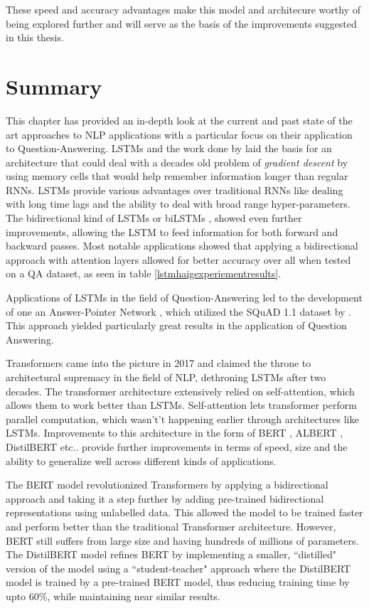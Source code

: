 \documentclass[a4paper,12pt]{report}
\begin{document}
	    These speed and accuracy advantages make this model and architecure worthy of being explored further and will serve as the basis of the improvements suggested in this thesis.

		\section{Summary}
		
		This chapter has provided an in-depth look at the current and past state of the art approaches to NLP applications with a particular focus on their application to Question-Answering. LSTMs and the work done by \citep{lstmoriginal} laid the basis for an architecture that could deal with a decades old problem of \textit{gradient descent} by using memory cells that would help remember information longer than regular RNNs. 
		LSTMs provide various advantages over traditional RNNs like dealing with long time lags and the ability to deal with broad range hyper-parameters. The bidirectional kind of LSTMs or biLSTMs \citep{bilstmHerman}, showed even further improvements, allowing the LSTM to feed information for both forward and backward passes. Most notable applications showed that applying a bidirectional approach with attention layers allowed for better accuracy over all when tested on a QA dataset, as seen in table \ref{lstmhaigexperiementresults}.
		
		Applications of LSTMs in the field of Question-Answering led to the development of one an Answer-Pointer Network \citep{lstmhu2016question}, which utilized the SQuAD 1.1 dataset by \citep{dataset1}. This approach yielded particularly great results in the application of Question Answering. 
		
		Transformers came into the picture in 2017 \citep{atayl} and claimed the throne to architectural supremacy in the field of NLP, dethroning LSTMs after two decades. The transformer architecture extensively relied on self-attention, which allows them to work better than LSTMs. Self-attention lets transformer perform parallel computation, which wasn't't happening earlier through architectures like LSTMs. Improvements to this architecture in the form of BERT \citep{bert}, ALBERT \citep{albert}, DistilBERT \citep{distil} etc.. provide further improvements in terms of speed, size and the ability to generalize well across different kinds of applications. 
		
		The BERT model revolutionized Transformers by applying a bidirectional approach and taking it a step further by adding pre-trained bidirectional representations using unlabelled data. This allowed the model to be trained faster and perform better than the traditional Transformer architecture. However, BERT still suffers from large size and having hundreds of millions of parameters. The DistilBERT model refines BERT by implementing a smaller, ``distilled" version of the model using a ``student-teacher" approach where the DistilBERT model is trained by a pre-trained BERT model, thus reducing training time by upto 60\%, while maintaining near similar results. 
		
\end{document}
